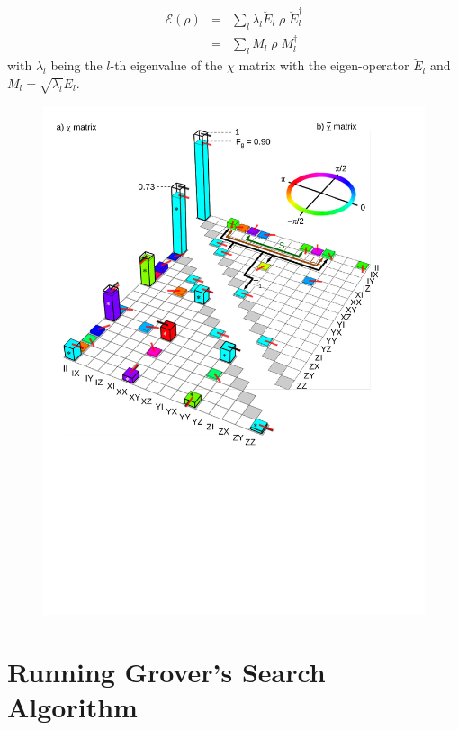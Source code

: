 \begin{eqnarray}
 \mathcal{E}(\rho) & = &  \sum\limits_{l} \lambda_l \breve{E}_l \; \rho \; \breve{E}_l^\dagger \\
& = &  \sum\limits_{l} M_l \; \rho \; M_l^\dagger
\end{eqnarray}
with $\lambda_l$ being the $l$-th eigenvalue of the $\chi$ matrix with the eigen-operator $\breve{E}_l$ and $M_{l} = \sqrt{\lambda_l} \breve{E}_l$.

\begin{figure}
	\centering
		\includegraphics[width=1.\textwidth]{./material/papers/iswap/figures/chi_matrix_and_error_process}
	\label{fig:GateChiMatrixAndErrorProcess}
	\caption{}
\end{figure}


\section{Running Grover's Search Algorithm}

